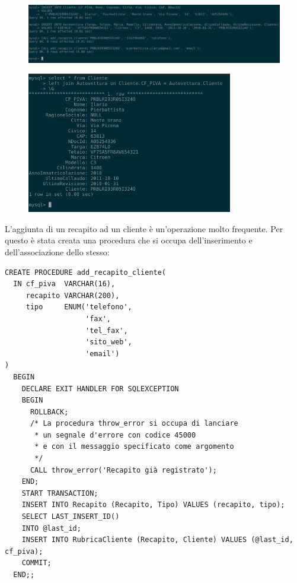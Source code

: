        \begin{figure}[H]
          \centering
          \includegraphics[width=15cm]{images/screenshots/nuovo_cliente.png}
        \end{figure}

        \begin{figure}[H]
          \centering
          \includegraphics[width=9cm]{images/screenshots/show_cliente_autovettura.png}
        \end{figure}

			L'aggiunta di un recapito ad un cliente è un'operazione molto frequente. Per questo è stata creata una procedura che si occupa dell'inserimento e dell'associazione dello stesso:
				\begin{lstlisting}
CREATE PROCEDURE add_recapito_cliente(
  IN cf_piva  VARCHAR(16),
     recapito VARCHAR(200),
     tipo     ENUM('telefono',
                   'fax',
                   'tel_fax',
                   'sito_web',
                   'email')
)
  BEGIN
    DECLARE EXIT HANDLER FOR SQLEXCEPTION
    BEGIN
      ROLLBACK;
      /* La procedura throw_error si occupa di lanciare 
       * un segnale d'errore con codice 45000
       * e con il messaggio specificato come argomento
       */
      CALL throw_error('Recapito già registrato');
    END;
    START TRANSACTION;
    INSERT INTO Recapito (Recapito, Tipo) VALUES (recapito, tipo);
    SELECT LAST_INSERT_ID()
    INTO @last_id;
    INSERT INTO RubricaCliente (Recapito, Cliente) VALUES (@last_id, cf_piva);
    COMMIT;
  END;;
				\end{lstlisting}

